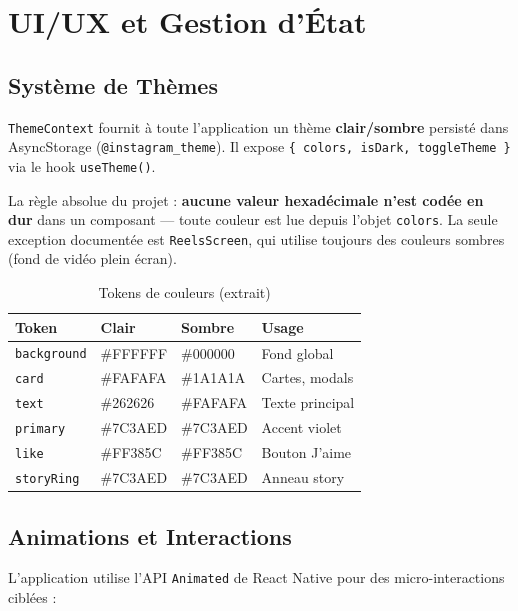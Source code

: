 \chapter{UI/UX et Gestion d'État}

\section{Système de Thèmes}

\texttt{ThemeContext} fournit à toute l'application un thème \textbf{clair/sombre} persisté dans AsyncStorage (\texttt{@instagram\_theme}). Il expose \texttt{\{ colors, isDark, toggleTheme \}} via le hook \texttt{useTheme()}.

La règle absolue du projet : \textbf{aucune valeur hexadécimale n'est codée en dur} dans un composant — toute couleur est lue depuis l'objet \texttt{colors}. La seule exception documentée est \texttt{ReelsScreen}, qui utilise toujours des couleurs sombres (fond de vidéo plein écran).

\begin{table}[H]
  \centering\small
  \begin{tabular}{@{}llll@{}}
    \toprule
    \textbf{Token} & \textbf{Clair} & \textbf{Sombre} & \textbf{Usage} \\
    \midrule
    \texttt{background} & \#FFFFFF & \#000000 & Fond global \\
    \texttt{card}       & \#FAFAFA & \#1A1A1A & Cartes, modals \\
    \texttt{text}       & \#262626 & \#FAFAFA & Texte principal \\
    \texttt{primary}    & \#7C3AED & \#7C3AED & Accent violet \\
    \texttt{like}       & \#FF385C & \#FF385C & Bouton J'aime \\
    \texttt{storyRing}  & \#7C3AED & \#7C3AED & Anneau story \\
    \bottomrule
  \end{tabular}
  \caption{Tokens de couleurs (extrait)}
\end{table}

\section{Animations et Interactions}

L'application utilise l'API \texttt{Animated} de React Native pour des micro-interactions ciblées :

